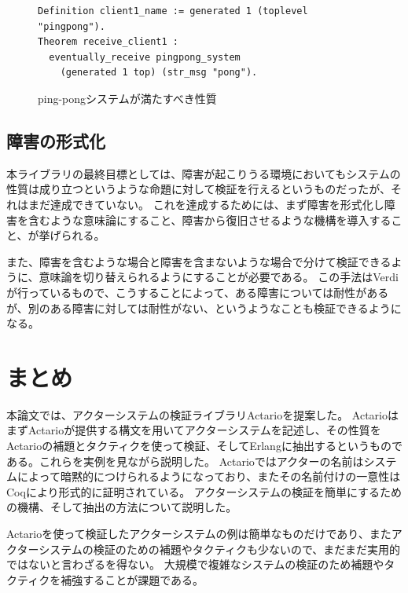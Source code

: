 \begin{figure}[tp]
\begin{lstlisting}
Definition client1_name := generated 1 (toplevel "pingpong").
Theorem receive_client1 :
  eventually_receive pingpong_system
    (generated 1 top) (str_msg "pong").
\end{lstlisting}
  \label{code:conclusion:pingpong-spec}
  \caption{ping-pongシステムが満たすべき性質}
\end{figure}

\subsection{障害の形式化}
本ライブラリの最終目標としては、障害が起こりうる環境においてもシステムの性質は成り立つというような命題に対して検証を行えるというものだったが、それはまだ達成できていない。
これを達成するためには、まず障害を形式化し障害を含むような意味論にすること、障害から復旧させるような機構を導入すること、が挙げられる。



また、障害を含むような場合と障害を含まないような場合で分けて検証できるように、意味論を切り替えられるようにすることが必要である。
この手法はVerdiが行っているもので、こうすることによって、ある障害については耐性があるが、別のある障害に対しては耐性がない、というようなことも検証できるようになる。


\section{まとめ}

本論文では、アクターシステムの検証ライブラリActarioを提案した。
ActarioはまずActarioが提供する構文を用いてアクターシステムを記述し、その性質をActarioの補題とタクティクを使って検証、そしてErlangに抽出するというものである。これらを実例を見ながら説明した。
Actarioではアクターの名前はシステムによって暗黙的につけられるようになっており、またその名前付けの一意性はCoqにより形式的に証明されている。
アクターシステムの検証を簡単にするための機構、そして抽出の方法について説明した。

Actarioを使って検証したアクターシステムの例は簡単なものだけであり、またアクターシステムの検証のための補題やタクティクも少ないので、まだまだ実用的ではないと言わざるを得ない。
大規模で複雑なシステムの検証のため補題やタクティクを補強することが課題である。
